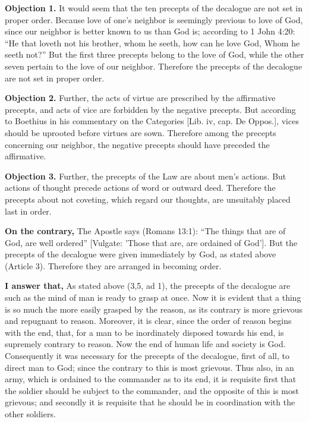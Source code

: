 
\textbf{Objection 1.} It would seem that the ten precepts of the decalogue are not set in proper order. Because love of one's neighbor is seemingly previous to love of God, since our neighbor is better known to us than God is; according to 1 John 4:20: ``He that loveth not his brother, whom he seeth, how can he love God, Whom he seeth not?'' But the first three precepts belong to the love of God, while the other seven pertain to the love of our neighbor. Therefore the precepts of the decalogue are not set in proper order.

\textbf{Objection 2.} Further, the acts of virtue are prescribed by the affirmative precepts, and acts of vice are forbidden by the negative precepts. But according to Boethius in his commentary on the Categories [Lib. iv, cap. De Oppos.], vices should be uprooted before virtues are sown. Therefore among the precepts concerning our neighbor, the negative precepts should have preceded the affirmative.

\textbf{Objection 3.} Further, the precepts of the Law are about men's actions. But actions of thought precede actions of word or outward deed. Therefore the precepts about not coveting, which regard our thoughts, are unsuitably placed last in order.

\textbf{On the contrary,} The Apostle says (Romans 13:1): ``The things that are of God, are well ordered'' [Vulgate: 'Those that are, are ordained of God']. But the precepts of the decalogue were given immediately by God, as stated above (Article 3). Therefore they are arranged in becoming order.

\textbf{I answer that,} As stated above (3,5, ad 1), the precepts of the decalogue are such as the mind of man is ready to grasp at once. Now it is evident that a thing is so much the more easily grasped by the reason, as its contrary is more grievous and repugnant to reason. Moreover, it is clear, since the order of reason begins with the end, that, for a man to be inordinately disposed towards his end, is supremely contrary to reason. Now the end of human life and society is God. Consequently it was necessary for the precepts of the decalogue, first of all, to direct man to God; since the contrary to this is most grievous. Thus also, in an army, which is ordained to the commander as to its end, it is requisite first that the soldier should be subject to the commander, and the opposite of this is most grievous; and secondly it is requisite that he should be in coordination with the other soldiers.

